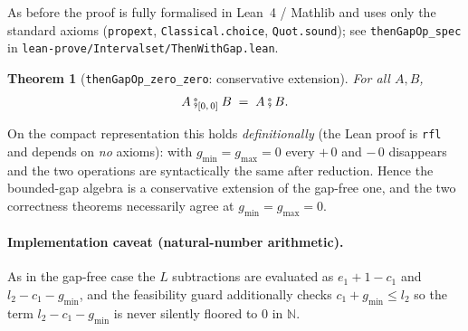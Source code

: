 \documentclass[11pt]{article}
\newcommand{\Then}{\mathbin{\fatsemi}}              %
\newcommand{\ThenG}[2]{\mathbin{\fatsemi}_{[#1,\,#2]}} %
\newcommand{\gmin}{g_{\min}}
\newcommand{\gmax}{g_{\max}}
\theoremstyle{definition}
\theoremstyle{plain}
\newtheorem{theorem}{Theorem}
\begin{document}
\noindent
As before the proof is fully formalised in Lean~4 / Mathlib and uses only the
standard axioms (\texttt{propext}, \texttt{Classical.choice},
\texttt{Quot.sound}); see \texttt{thenGapOp\_spec} in
\texttt{lean-prove/Intervalset/ThenWithGap.lean}.

\begin{theorem}[\texttt{thenGapOp\_zero\_zero}: conservative extension]
For all $A, B$,
\[
  A \ThenG{0}{0} B \;=\; A \Then B .
\]
\end{theorem}

\noindent
On the compact representation this holds \emph{definitionally} (the Lean proof
is \texttt{rfl} and depends on \emph{no} axioms): with $\gmin = \gmax = 0$ every
$+\,0$ and $-\,0$ disappears and the two operations are syntactically the same
after reduction. Hence the bounded-gap algebra is a conservative extension of
the gap-free one, and the two correctness theorems necessarily agree at
$\gmin = \gmax = 0$.

\paragraph{Implementation caveat (natural-number arithmetic).}
As in the gap-free case the $L$ subtractions are evaluated as $e_1 + 1 - c_1$
and $l_2 - c_1 - \gmin$, and the feasibility guard additionally checks
$c_1 + \gmin \le l_2$ so the term $l_2 - c_1 - \gmin$ is never silently floored
to $0$ in $\mathbb{N}$.
\end{document}
